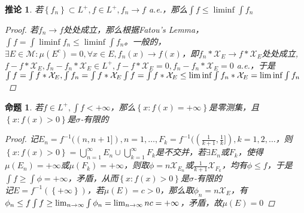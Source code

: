 \documentclass[12pt, a4paper, oneside]{ctexbook}
\newtheorem{corollary}[theorem]{推论}
\newtheorem{proposition}[theorem]{命题}
\begin{document}
\begin{corollary}
    若$\left\{f_n\right\}\subset L^+,f\in L^+,f_n\to f$ a.e.，那么$\int f\leq \liminf\int f_n$
    \begin{proof}
        若$f_n\to f$处处成立，那么根据Fatou's Lemma，$\int f=\int \liminf f_n\leq
        \liminf \int f_n$。一般的，$\exists E\in\mathcal{M}:\mu(E^c)=0,\forall x\in E,f_n(x)\to f(x)$，即$f_n*
        \mathcal{X}_E\to f*\mathcal{X}_E$处处成立,$f-f*\mathcal{X}_E,f_n-f_n*\mathcal{X}_E\in L^+,f-f*\mathcal{X}_E=0,f_n-
        f_n*\mathcal{X}_E=0$ a.e.，于是$\int f=\int f*\mathcal{X}_E,\int f_n=\int f*\mathcal{X}_E\\
        \int f=\int f*\mathcal{X}_E\leq \liminf \int f_n*\mathcal{X}_E=\liminf \int f_n$
    \end{proof}
\end{corollary}
\begin{proposition}
    若$f\in L^+,\int f<+\infty$，那么$\left\{x:f(x)=+\infty\right\}$是零测集，且
    $\left\{x:f(x)>0\right\}$是$\sigma$-有限的
    \begin{proof}
        记$E_n=f^{-1}((n,n+1]),n=1,\dots,F_k=f^{-1}((\frac{1}{k+1},\frac{1}{k}]),k=1,2,\dots
        $，则$\left\{x:f(x)>0\right\}=\bigcup_{n=1}^{\infty}E_n\cup\bigcup_{k=1}^{\infty}F_k$是不交并，若$\exists E_n$或$F_k$，使得$\mu(E_n)=
        +\infty$或$\mu(F_k)=+\infty$，则取$\phi=n\mathcal{X}_{E_n}$或$\frac{1}{k+1}\mathcal{X}_{F_k}$，均有$\phi\leq f$，于是$\int f\geq
        \int \phi=+\infty$，矛盾，从而$\left\{x:f(x)>0\right\}$是$\sigma$-有限的\\
        记$E=f^{-1}(\left\{+\infty\right\})$，若$\mu(E)=c>0$，那么取$\phi_n=n\mathcal{X}_E$，有$\phi_n\leq f\\
        \int f\geq\lim_{n\to\infty}\int \phi_n=\lim_{n\to\infty}nc=+\infty$，矛盾，故$\mu(E)=0$
    \end{proof}
\end{proposition}
\end{document}
